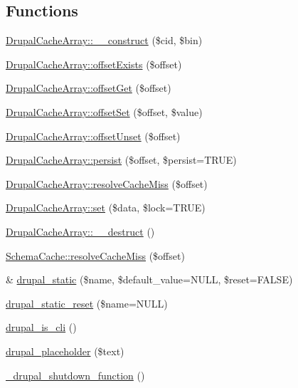 \subsection*{Functions}
\begin{DoxyCompactItemize}
\item 
\hyperlink{group__schemaapi_gadbc374d9057276944d38062e769a1a99}{DrupalCacheArray::\_\-\_\-construct} (\$cid, \$bin)
\item 
\hyperlink{group__schemaapi_gabec90ca8c02f7c14dfbf66fd9e6bb5dd}{DrupalCacheArray::offsetExists} (\$offset)
\item 
\hyperlink{group__schemaapi_ga57be4d1b39bee68ee1c395c1cd9a2de5}{DrupalCacheArray::offsetGet} (\$offset)
\item 
\hyperlink{group__schemaapi_ga0d3377e6f4b8c592f006a75f8eadf21a}{DrupalCacheArray::offsetSet} (\$offset, \$value)
\item 
\hyperlink{group__schemaapi_ga8bb43551e89c35590c56a49f8fb54e3f}{DrupalCacheArray::offsetUnset} (\$offset)
\item 
\hyperlink{group__schemaapi_ga27687007f42979bdb8999683f3270c4a}{DrupalCacheArray::persist} (\$offset, \$persist=TRUE)
\item 
\hyperlink{group__schemaapi_ga33d892a839b353177e2483f6946178e9}{DrupalCacheArray::resolveCacheMiss} (\$offset)
\item 
\hyperlink{group__schemaapi_ga9d99af903ba2660c09ca835e63c79118}{DrupalCacheArray::set} (\$data, \$lock=TRUE)
\item 
\hyperlink{group__schemaapi_ga63c3aa47f3a451f0c5182800d29d5d9f}{DrupalCacheArray::\_\-\_\-destruct} ()
\item 
\hyperlink{group__schemaapi_gadb0a973c0269c37d3389946d5b57c01c}{SchemaCache::resolveCacheMiss} (\$offset)
\item 
\& \hyperlink{group__schemaapi_ga498392997d598f196f35805de85d8b21}{drupal\_\-static} (\$name, \$default\_\-value=NULL, \$reset=FALSE)
\item 
\hyperlink{group__schemaapi_ga714b5ed0b14c43b61eef0c895598c5c4}{drupal\_\-static\_\-reset} (\$name=NULL)
\item 
\hyperlink{group__schemaapi_gac880b82ae302f9d15c64d264a269d1f4}{drupal\_\-is\_\-cli} ()
\item 
\hyperlink{group__schemaapi_ga4ab49ad51d8b93bb296a8492296d655b}{drupal\_\-placeholder} (\$text)
\item 
\hyperlink{group__schemaapi_ga8da38564ce2a3c92aa5103da6ae2a315}{\_\-drupal\_\-shutdown\_\-function} ()
\item 

\end{DoxyCompactItemize}
